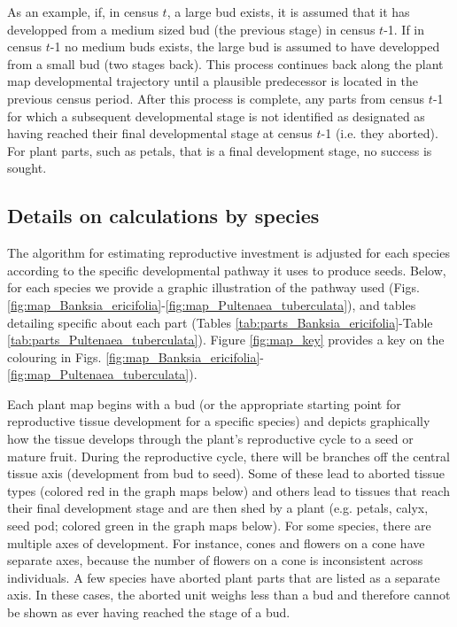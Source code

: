 \documentclass[10pt,twoside]{article}\usepackage[]{graphicx}\usepackage[]{color}
\begin{document}
As an example, if, in census $t$, a large bud exists, it is assumed that it has developped from a medium sized bud (the previous stage) in census $t$-1. If in census $t$-1 no medium buds exists, the large bud is assumed to have developped from a small bud (two stages back). This process continues back along the plant map developmental trajectory until a plausible predecessor is located in the previous census period. After this process is complete, any parts from census $t$-1 for which a subsequent developmental stage is not identified as designated as having reached their final developmental stage at census $t$-1 (i.e. they aborted). For plant parts, such as petals, that is a final development stage, no success is sought.


\subsection{Details on calculations by species}

The algorithm for estimating reproductive investment is adjusted for each species according to the specific developmental pathway it uses to produce seeds. Below, for each species we provide a graphic illustration of the pathway used (Figs. \ref{fig:map_Banksia_ericifolia}-\ref{fig:map_Pultenaea_tuberculata}), and tables detailing specific about each part (Tables \ref{tab:parts_Banksia_ericifolia}-Table \ref{tab:parts_Pultenaea_tuberculata}).  Figure \ref{fig:map_key} provides a key on the colouring in Figs. \ref{fig:map_Banksia_ericifolia}-\ref{fig:map_Pultenaea_tuberculata}).

Each plant map begins with a bud (or the appropriate starting point for reproductive tissue development for a specific species) and depicts graphically how the tissue develops through the plant's reproductive cycle to a seed or mature fruit. During the reproductive cycle, there will be branches off the central tissue axis (development from bud to seed). Some of these lead to aborted tissue types (colored red in the graph maps below) and others lead to tissues that reach their final development stage and are then shed by a plant (e.g. petals, calyx, seed pod; colored green in the graph maps below). For some species, there are multiple axes of development. For instance, cones and flowers on a cone have separate axes, because the number of flowers on a cone is inconsistent across individuals. A few species have aborted plant parts that are listed as a separate axis. In these cases, the aborted unit weighs less than a bud and therefore cannot be shown as ever having reached the stage of a bud.
\end{document}
